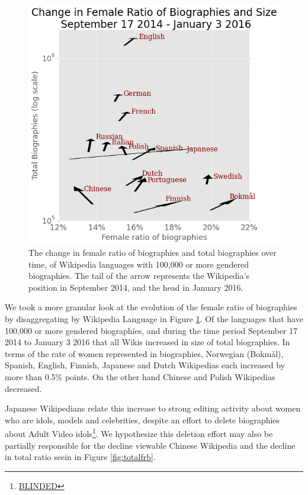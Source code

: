 \documentclass{sig-alternate-05-2015}
\begin{document}
\begin{figure}
\includegraphics[width=\columnwidth]{figures/arrowplot_flippedaxes.png} 
\caption{The change in female ratio of biographies and total biographies over time, of Wikipedia languages with 100,000 or more gendered biographies. The tail of the arrow represents the Wikipedia's position in September 2014, and the head in January 2016.}
\label{fig:changefrb}
\end{figure}

We took a more granular look at the evolution of the female ratio of biographies by disaggregating by Wikipedia Language in Figure \ref{fig:changefrb}. Of the languages that have 100,000 or more gendered biographies, and during the time period September 17 2014 to January 3 2016 that all Wikis increased in size of total biographies. In terms of the rate of women represented in biographies, Norwegian (Bokm\aa l), Spanish, English, Finnish, Japanese and Dutch Wikipedias each increased by more than 0.5\% points. On the other hand Chinese and Polish Wikipedias decreased. 

Japanese Wikipedians relate this increase to strong editing activity about women who are idols, models and celebrities, despite an effort to delete biographies about Adult Video idols\footnote{\url{BLINDED}}. We hypothesize this deletion effort may also be partially responsible for the decline viewable Chinese Wikipedia and the decline in total ratio seein in Figure \ref{fig:totalfrb}.
\end{document}
